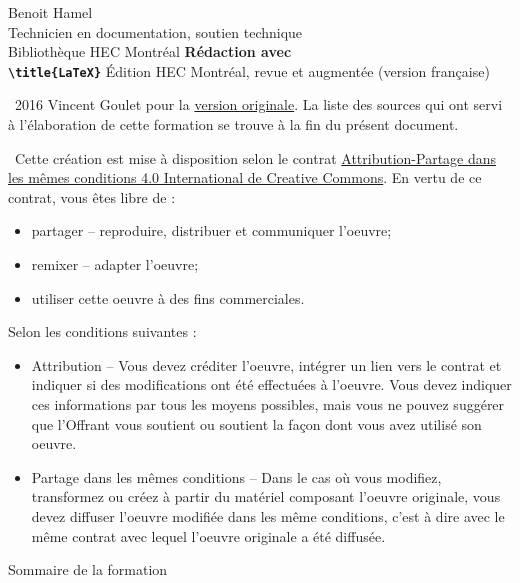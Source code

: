 \scriptsize

\begin{frame}
	Benoit Hamel \\
	Technicien en documentation, soutien technique \\
	Bibliothèque HEC Montréal
	\vfill
	{
		\Huge\bfseries
		Rédaction avec \\
		\texttt{\textbackslash title\{\textrm{\LaTeX}\}}
	}
	\vfill
	Édition HEC Montréal, revue et augmentée (version française)
\end{frame}

\begin{frame}
	\faCopyright\ 2016 Vincent Goulet pour la 
	\href{https://ctan.org/pkg/formation-latex-ul}{version originale}. La liste des sources qui ont 
	servi à l'élaboration de cette formation se trouve à la fin du présent document.
	
	\faCreativeCommons\ Cette création est mise à disposition selon le contrat 
	\href{http://creativecommons.org/licenses/by-sa/4.0/deed.fr}{%
	Attribution-Partage dans les mêmes conditions 4.0 International de Creative Commons}. 
	En vertu de ce contrat, vous êtes libre de :
	
	\begin{itemize}
		\item partager -- reproduire, distribuer et communiquer l’oeuvre;
		\item remixer -- adapter l’oeuvre;
		\item utiliser cette oeuvre à des fins commerciales.
	\end{itemize}

	Selon les conditions suivantes :
	
	\begin{itemize}
		\item Attribution -- Vous devez créditer l’oeuvre, intégrer un lien vers le contrat et indiquer si des modifications ont été effectuées à l’oeuvre. Vous devez indiquer ces informations par tous les moyens possibles, mais vous ne pouvez suggérer que l’Offrant vous soutient ou soutient la façon dont vous avez utilisé son oeuvre.
		\item Partage dans les mêmes conditions -- Dans le cas où vous modifiez, transformez ou créez à partir du matériel composant l’oeuvre
		originale, vous devez diffuser l’oeuvre modifiée dans les même conditions, c’est à dire avec le même contrat avec lequel l’oeuvre originale a été diffusée.
	\end{itemize}
\end{frame}

\begin{frame}{Sommaire de la formation}
	\tableofcontents
\end{frame}